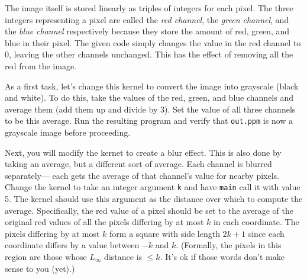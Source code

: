 \documentclass{article}
\begin{document}
The image itself is stored linearly as triples of integers for each
pixel.
The three integers representing a pixel are called the {\em red channel}, the
{\em green channel}, and the {\em blue channel} respectively because
they store the amount of red, green, and blue in their pixel.
The given code simply changes the value in the red channel to 0,
leaving the other channels unchanged.
This has the effect of removing all the red from the image. 

As a first task, let's change this kernel to convert the image into
grayscale (black and white).
To do this, take the values of the red, green, and blue channels and
average them (add them up and divide by 3).
Set the value of all three channels to be this average.
Run the resulting program and verify that {\tt out.ppm} is now a
grayscale image before proceeding.

Next, you will modify the kernet to create a blur effect.
This is also done by taking an average, but a different sort of average.
Each channel is blurred separately--- each gets the average of that
channel’s value for nearby pixels.
Change the kernel to take an integer argument {\tt k} and
have {\tt main} call it with value 5.
The kernel should use this argument as the distance over which to
compute the average. 
Specifically, the red value of a pixel should be set to the average of
the original red values of all the pixels differing by at most $k$ in each
coordinate.
The pixels differing by at most $k$ form a square with side
length $2k+1$ since each coordinate differs by a value between $-k$ and
$k$.
(Formally, the pixels in this region are those whose $L_\infty$
distance is $\leq k$.
It’s ok if those words don’t make sense to you (yet).)
\end{document}
